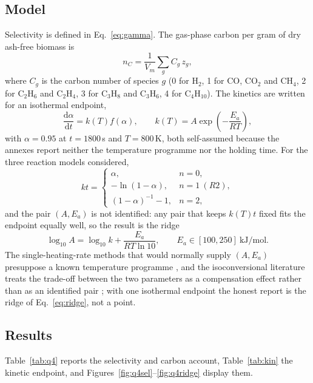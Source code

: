\documentclass[withoutpreface,bwprint]{apmcmthesis}
\begin{document}
\subsection{Model}
Selectivity is defined in Eq.~\eqref{eq:gamma}. The gas-phase carbon per gram of dry ash-free biomass is
\begin{equation}
n_C=\frac{1}{V_m}\sum_{g}C_g\,z_g,
\label{eq:nc}
\end{equation}
where $C_g$ is the carbon number of species $g$ (0 for H$_2$, 1 for CO, CO$_2$ and CH$_4$, 2 for C$_2$H$_6$ and C$_2$H$_4$, 3 for C$_3$H$_8$ and C$_3$H$_6$, 4 for C$_4$H$_{10}$). The kinetics are written for an isothermal endpoint,
\begin{equation}
\frac{\mathrm{d}\alpha}{\mathrm{d}t}=k(T)f(\alpha),\qquad
k(T)=A\exp\!\left(-\frac{E_a}{RT}\right),
\label{eq:rate}
\end{equation}
with $\alpha=0.95$ at $t=1800$\,s and $T=800$\,K, both self-assumed because the annexes report neither the temperature programme nor the holding time. For the three reaction models considered,
\begin{equation}
kt=\begin{cases}\alpha, & n=0,\\ -\ln(1-\alpha), & n=1\ (R2),\\ (1-\alpha)^{-1}-1, & n=2,\end{cases}
\label{eq:kt}
\end{equation}
and the pair $(A,E_a)$ is not identified: any pair that keeps $k(T)t$ fixed fits the endpoint equally well, so the result is the ridge
\begin{equation}
\log_{10}A=\log_{10}k+\frac{E_a}{RT\ln 10},\qquad E_a\in[100,250]\ \mathrm{kJ/mol}.
\label{eq:ridge}
\end{equation}
The single-heating-rate methods that would normally supply $(A,E_a)$ presuppose a known temperature programme \cite{Kissinger1957,Ozawa1965}, and the isoconversional literature treats the trade-off between the two parameters as a compensation effect rather than as an identified pair \cite{Vyazovkin2011,Brown2000}; with one isothermal endpoint the honest report is the ridge of Eq.~\eqref{eq:ridge}, not a point.

\subsection{Results}
Table~\ref{tab:q4} reports the selectivity and carbon account, Table~\ref{tab:kin} the kinetic endpoint, and Figures~\ref{fig:q4sel}--\ref{fig:q4ridge} display them.
\end{document}
